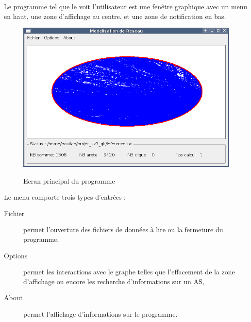 Le programme tel que le voit l'utilisateur est une fen\^etre graphique avec un menu en haut, une zone d'affichage au centre, et une zone de notification en bas.

\begin{figure}[H]
\centering
 \fbox
 {
 \includegraphics[width=16cm]{./schema/capture_ecran_programme.png}
 }
  \caption{\label{ecran_principal}Ecran principal du programme}
\end{figure}


Le menu comporte trois types d'entr\'ees :
\begin{description}
 \item[Fichier] permet l'ouverture des fichiers de donn\'ees \`a lire ou la fermeture du programme,
 \item[Options] permet les interactions avec le graphe telles que l'effacement de la zone d'affichage ou encore les recherche d'informations sur un AS,
 \item[About] permet l'affichage d'informations sur le programme.
\end{description}

